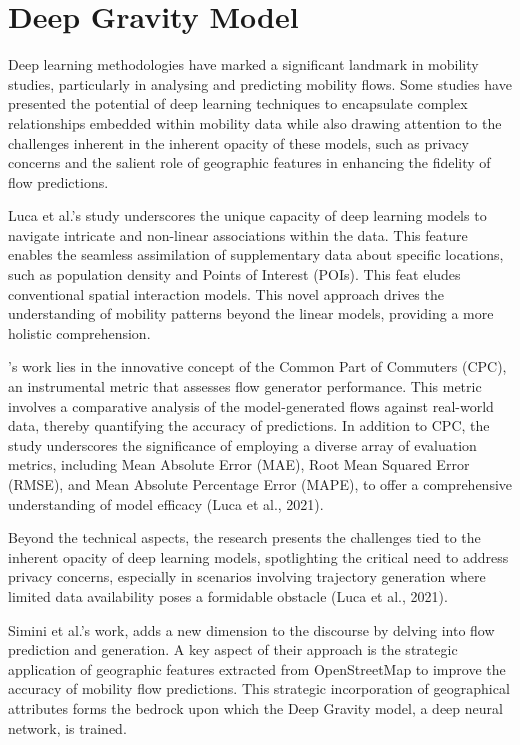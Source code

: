         
    \section{Deep Gravity Model}

    Deep learning methodologies have marked a significant landmark in mobility studies, particularly in analysing and predicting mobility flows. Some studies have presented the potential of deep learning techniques to encapsulate complex relationships embedded within mobility data while also drawing attention to the challenges inherent in the inherent opacity of these models, such as privacy concerns and the salient role of geographic features in enhancing the fidelity of flow predictions.

    Luca et al.'s study underscores the unique capacity of deep learning models to navigate intricate and non-linear associations within the data. This feature enables the seamless assimilation of supplementary data about specific locations, such as population density and Points of Interest (POIs). This feat eludes conventional spatial interaction models. This novel approach drives the understanding of mobility patterns beyond the linear models, providing a more holistic comprehension\citep{lucaSurveyDeepLearning2021}.

    \cite{lucaSurveyDeepLearning2021}'s work lies in the innovative concept of the Common Part of Commuters (CPC), an instrumental metric that assesses flow generator performance. This metric involves a comparative analysis of the model-generated flows against real-world data, thereby quantifying the accuracy of predictions. In addition to CPC, the study underscores the significance of employing a diverse array of evaluation metrics, including Mean Absolute Error (MAE), Root Mean Squared Error (RMSE), and Mean Absolute Percentage Error (MAPE), to offer a comprehensive understanding of model efficacy (Luca et al., 2021). 

    Beyond the technical aspects, the research presents the challenges tied to the inherent opacity of deep learning models, spotlighting the critical need to address privacy concerns, especially in scenarios involving trajectory generation where limited data availability poses a formidable obstacle (Luca et al., 2021).

    Simini et al.'s work, adds a new dimension to the discourse by delving into flow prediction and generation. A key aspect of their approach is the strategic application of geographic features extracted from OpenStreetMap to improve the accuracy of mobility flow predictions. This strategic incorporation of geographical attributes forms the bedrock upon which the Deep Gravity model, a deep neural network, is trained.
 

